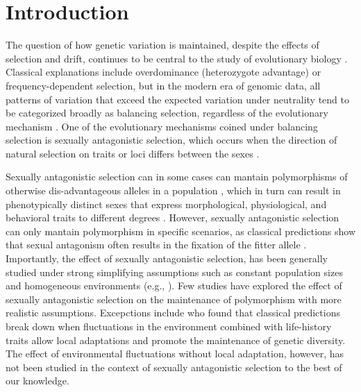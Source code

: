 
\clearpage
\section{Introduction}
The question of how genetic variation is maintained, despite the effects of selection and drift, continues to be central to the study of evolutionary biology \citep{walsh_evolution_2018}. Classical explanations include overdominance (heterozygote advantage) or frequency-dependent selection, but in the modern era of genomic data, all patterns of variation that exceed the expected variation under neutrality tend to be categorized broadly as balancing selection, regardless of the evolutionary mechanism \citep{mitchell-olds_which_2007}.  One of the evolutionary mechanisms coined under balancing selection is sexually antagonistic selection, which occurs when the direction of natural selection on traits or loci differs between the sexes \citep{lande1980sexual,arnqvist2013sexual}.

Sexually antagonistic selection can in some cases can mantain polymorphisms of otherwise dis-advantageous alleles in a population \citep{gavrilets2014sexual}, which in turn can result in phenotypically distinct sexes that express  morphological, physiological, and behavioral traits to different degrees \citep{mori2017sexual,connallon2018environmental}. However,  sexually antagonistic selection can only mantain polymorphism in specific scenarios, as classical predictions show that sexual antagonism often results in the fixation of the fitter allele \citep{kidwell1977regions,pamilo1979genic,hedrick1999antagonistic,curtsinger1994antagonistic, patten2010fitness} . Importantly, the effect of sexually antagonistic selection, has been generally studied under strong simplifying assumptions such as constant population sizes and homogeneous environments (e.g., \citet{kidwell1977regions, pamilo1979genic, immler2012ploidally}). Few studies have explored the effect of sexually antagonistic selection on the maintenance of polymorphism with more realistic assumptions. Excepctions include \citet{connallon_evolutionary_2018} who found that classical predictions break down when fluctuations in the environment combined with life-history traits allow local adaptations and promote the maintenance of genetic diversity. The effect of environmental fluctuations without local adaptation, however, has not been studied in the context of sexually antagonistic selection to the best of our knowledge.


